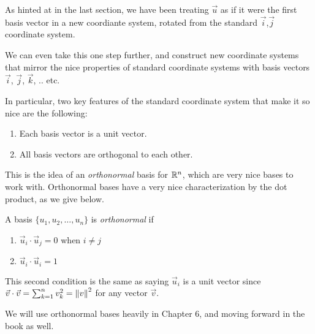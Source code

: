 \documentclass{ximera}
\begin{document}
As hinted at in the last section, we have been treating $\vec{u}$ as if it were the first basis vector in a new coordiante system, rotated from the standard $\vec{i}$,$\vec{j}$ coordinate system.

We can even take this one step further, and construct new coordinate systems that mirror the nice properties of standard coordinate systems with basis vectors $\vec{i}$, $\vec{j}$, $\vec{k}$, .. etc. 

In particular, two key features of the standard coordinate system that make it so nice are the following:

\begin{enumerate}
   \item Each basis vector is a unit vector.
   \item All basis vectors are orthogonal to each other.
\end{enumerate}

This is the idea of an \emph{orthonormal} basis for $\mathbb{R}^n$, which are very nice bases to work with. Orthonormal bases have a very nice characterization by the dot product, as we give below.

\begin{definition}
   A basis $\lbrace u_1,u_2,\ldots,u_n\rbrace$ is \emph{orthonormal} if 

   \begin{enumerate}
      \item $\vec{u}_i\cdot\vec{u}_j=0$ when $i\neq j$
      \item $\vec{u}_i\cdot\vec{u}_i=1$
   \end{enumerate}

   This second condition is the same as saying $\vec{u}_i$ is a unit vector since $\vec{v}\cdot\vec{v}=\sum_{k=1}^nv_k^2=\left\|v\right\|^2$ for any vector $\vec{v}$.
\end{definition}

We will use orthonormal bases heavily in Chapter 6, and moving forward in the book as well.
\end{document}
